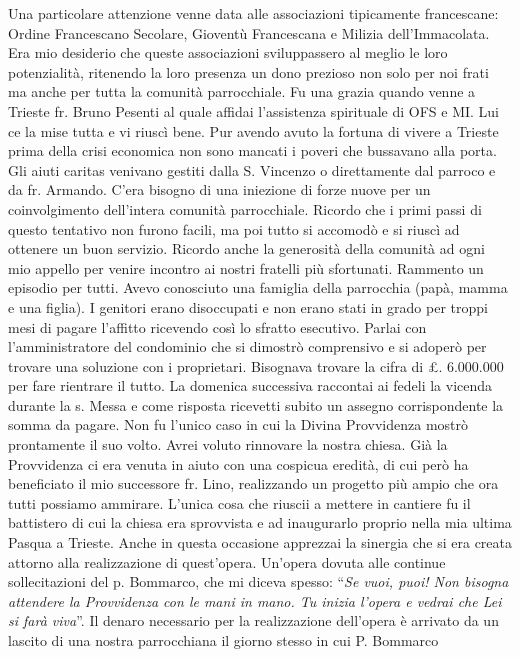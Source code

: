 Una particolare attenzione venne data alle associazioni tipicamente francescane: Ordine 
Francescano Secolare, Gioventù Francescana e Milizia dell’Immacolata. Era mio desiderio che 
queste associazioni sviluppassero al meglio le loro potenzialità, ritenendo la loro presenza un 
dono prezioso non solo per noi frati ma anche per tutta la comunità parrocchiale. Fu una grazia 
quando venne a Trieste fr. Bruno Pesenti al quale affidai l’assistenza spirituale di OFS e MI. Lui 
ce la mise tutta e vi riuscì bene.
\medbreak
Pur avendo avuto la fortuna di vivere a Trieste prima della crisi economica non sono mancati i 
poveri che bussavano alla porta. Gli aiuti caritas venivano gestiti dalla S. Vincenzo o 
direttamente dal parroco e da fr. Armando. C’era bisogno di una iniezione di forze nuove per un 
coinvolgimento dell’intera comunità parrocchiale. Ricordo che i primi passi di questo tentativo 
non furono facili, ma poi tutto si accomodò e si riuscì ad ottenere un buon servizio. Ricordo 
anche la generosità della comunità ad ogni mio appello per venire incontro ai nostri fratelli più 
sfortunati. Rammento un episodio per tutti. Avevo conosciuto una famiglia della parrocchia 
(papà, mamma e una figlia). I genitori erano disoccupati e non erano stati in grado per troppi 
mesi di pagare l’affitto ricevendo così lo sfratto esecutivo. Parlai con l’amministratore del 
condominio che si dimostrò comprensivo e si adoperò per trovare una soluzione con i proprietari. 
Bisognava trovare la cifra di £. 6.000.000 per fare rientrare il tutto. La domenica successiva 
raccontai ai fedeli la vicenda durante la s. Messa e come risposta ricevetti subito un assegno 
corrispondente la somma da pagare. Non fu l’unico caso in cui la Divina Provvidenza mostrò 
prontamente il suo volto.
\medbreak
Avrei voluto rinnovare la nostra chiesa. Già la Provvidenza ci era venuta in aiuto con una 
cospicua eredità, di cui però ha beneficiato il mio successore fr. Lino, realizzando un progetto 
più ampio che ora tutti possiamo ammirare. L’unica cosa che riuscii a mettere in cantiere fu il 
battistero di cui la chiesa era sprovvista e ad inaugurarlo proprio nella mia ultima Pasqua a 
Trieste. Anche in questa occasione apprezzai la sinergia che si era creata attorno alla 
realizzazione di quest’opera. Un’opera dovuta alle continue sollecitazioni del p. Bommarco, che 
mi diceva spesso: “\textit{Se vuoi, puoi! Non bisogna attendere la Provvidenza con le mani in mano.
Tu inizia l’opera e vedrai che Lei si farà viva}”. Il denaro necessario per la realizzazione
dell’opera è arrivato da un lascito di una nostra parrocchiana il giorno stesso in cui P. Bommarco 
